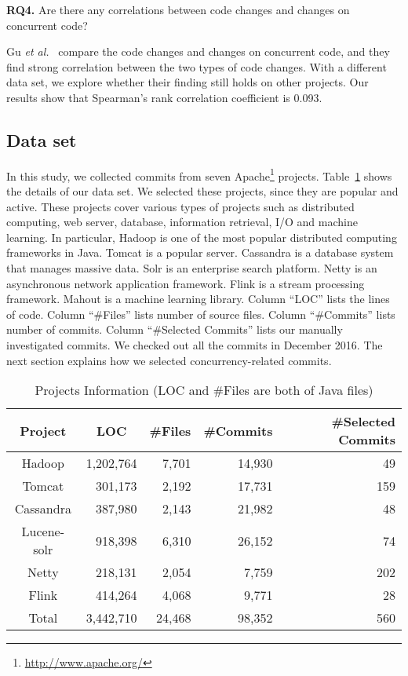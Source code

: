 \textbf{RQ4.} Are there any correlations between code changes and changes on concurrent code?

Gu \emph{et al.}~\cite{conf/sigsoft/GuJSZL15} compare the code changes and changes on concurrent code, and they find strong correlation between the two types of code changes. With a different data set, we explore whether their finding still holds on other projects. Our results show that Spearman's rank correlation coefficient is 0.093.

\subsection{Data set}
\label{sec:method:data}
In this study, we collected commits from seven Apache\footnote{\url{http://www.apache.org/}} projects. Table~\ref{table:dataset} shows the details of our data set. We selected these projects, since they are popular and active. These projects cover various types of projects such as distributed computing, web server, database, information retrieval, I/O and machine learning. In particular, Hadoop is one of the most popular distributed computing frameworks in Java. Tomcat is a popular server. Cassandra is a database system that manages massive data. Solr is an enterprise search platform. Netty is an asynchronous network application framework. Flink is a stream processing framework. Mahout is a machine learning library. Column ``LOC'' lists the lines of code. Column ``\#Files'' lists number of source files. Column ``\#Commits'' lists number of commits. Column ``\#Selected Commits'' lists our manually investigated commits. We checked out all the commits in December 2016. The next section explains how we selected concurrency-related commits.

\begin{table}
	\centering
	\caption{Projects Information (LOC and \#Files are both of Java files)}
    \label{table:dataset}
	\begin{tabular}{|c|r|r|r|r|}\hline
		Project&\multicolumn{1}{|c|}{LOC}&\#Files&\#Commits&\#Selected Commits\\\hline
		Hadoop&1,202,764&7,701&14,930&49\\
		Tomcat&301,173&2,192&17,731&159\\
		Cassandra&387,980&2,143&21,982&48\\
		Lucene-solr&918,398&6,310&26,152&74\\
		Netty&218,131&2,054&7,759&202\\
		Flink&414,264&4,068&9,771&28\\\hline
		Total&3,442,710&24,468&98,352&560\\\hline
	\end{tabular}
\end{table}

